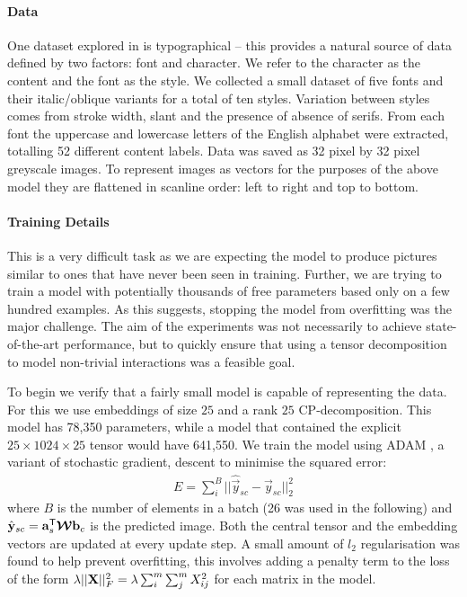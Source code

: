 \paragraph{Data}
One dataset explored in \autocite{Tenenbaum2000} is typographical -- this provides a natural
source of data defined by two factors: font and character. We refer to the character as the
content and the font as the style. We collected a small dataset of five fonts and their
italic/oblique variants for a total of ten styles. Variation between styles comes from stroke
width, slant and the presence of absence of serifs. From each font the uppercase and lowercase
letters of the English alphabet were extracted, totalling 52 different content labels. Data was
saved as 32 pixel by 32 pixel greyscale images. To represent images as vectors for the purposes
of the above model they are flattened in scanline order: left to right and top to bottom.

\paragraph{Training Details}
This is a very difficult task as we are expecting the model to produce pictures similar to ones
that have never been seen in training. Further, we are trying to train a model with potentially
thousands of free parameters based only on a few hundred examples. As this suggests, stopping
the model from overfitting was the major challenge. The aim of the experiments was not
necessarily to achieve state-of-the-art performance, but to quickly ensure that using a tensor
decomposition to model non-trivial interactions was a feasible goal.

To begin we verify that a fairly small model is capable of representing the data. For this we
use embeddings of size \(25\) and a rank \(25\) CP-decomposition. This model has 78,350
parameters, while a model that contained the explicit \(25 \times 1024 \times 25\) tensor
would have 641,550. We train the model using ADAM \autocite{Kingma2014}, a variant of
stochastic gradient, descent to minimise the squared error:
\begin{align}
	E = \sum_{i}^B ||\hat{\vec{y}}_{sc} - \vec{y}_{sc}||_2^2
\end{align} where \(B\) is the number of elements in a batch (26 was used in the following) and
\(\hat{\mathbf{y}}_{sc} = \mathbf{a}_s^\mathsf{T}\bm{\mathcal{W}}\mathbf{b}_c\) is the predicted image. Both
the central tensor and the embedding vectors are updated at every update step. A small amount
of \(l_2\) regularisation was found to help prevent overfitting, this involves adding a penalty
term to the loss of the form \(\lambda||\mathbf{X}||_F^2 = \lambda\sum_i^m\sum_j^mX_{ij}^2\) for
each matrix in the model.

